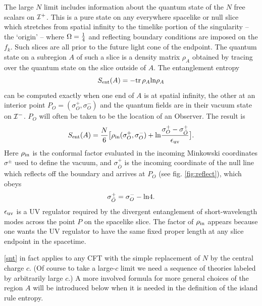 \documentclass[11pt,oneside,letterpaper]{article}
\newcommand{\be}{\begin{equation}}
\newcommand{\ee}{\end{equation}}
\def\be{\begin{eqnarray}}
\def\ee{\end{eqnarray}}
\let\s=\sigma \let\t=\tau \let\u=\upsilon \let\c=\chi
\def\be{\begin{equation}}
\def\ee{\end{equation}}
\def\euv{\epsilon_{\rm uv}}
\def\log{{\rm ln}}
\numberwithin{equation}{section}
\def \be {\begin{equation}}
\def \ee {\end{equation}}
\begin{document}
The large $N$ limit includes information about the quantum state of the $N$ free scalars on ${\cal I}^+$. This is a pure state on any everywhere spacelike or null slice which 
stretches from spatial infinity to the timelike portion of the singularity -- the `origin' -- where $\Omega={1 \over 4}$ and reflecting  boundary conditions are imposed on the $f_k$. Such slices are all prior to the future light cone of the endpoint. 
The quantum state on a subregion $A$ of such a slice is a density matrix $\rho_A$ obtained by tracing over the quantum  state on the slice outside of $A$.  The entanglement entropy \be S_{\rm ent}(A)=-\mbox{tr}\, \rho_A\log \rho_A \ee
can be computed exactly \cite{Fiola:1994ir} when one end of $A$ is at spatial infinity, the other at an interior point $P_O=( \s^+_O,\s^-_O)$ and the quantum fields are in their vacuum state on ${\cal I}^-$.  $P_O$ will often be taken to be the location of an Observer. The result is \cite{Fiola:1994ir}
\be \label{snt} S_{\rm ent}(A)={N \over 6}\big[ \rho_{\rm in}(\s^+_O,\s^-_O)+\log {\s^+_O-\s^+_{\bar O} \over \euv}\big].\ee
Here  $\rho_{\rm in} $ is the conformal factor evaluated in the incoming Minkowski coordinates $\sigma^\pm$ used to define the vacuum, and $\s^+_{\bar O} $ is the incoming coordinate of the null line which reflects off the boundary and arrives at $P_O$ (see fig. \ref{fig:reflect}), which obeys 
\be \s^+_{\bar O} =\s^-_O-\log 4.\ee  $\euv$ is a UV regulator required by the divergent entanglement of short-wavelength modes across the point $P$ on the spacelike slice. The factor of $\rho_{\rm in}$ appears because one wants the UV regulator to have the same fixed proper length at any slice endpoint in the spacetime. 

\eqref{snt} in fact applies to any CFT with the simple replacement of $N$ by the central charge $c$.  (Of course to take a large-$c$ limit we need a sequence of theories labeled by arbitrarily large $c$.) A more involved formula for more general choices of the region $A$ will be introduced below when it is needed in the definition of the island rule entropy. 
\end{document}
